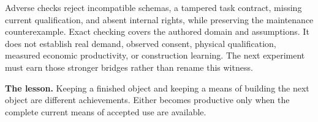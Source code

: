 Adverse checks reject incompatible schemas, a tampered task contract, missing
current qualification, and absent internal rights, while preserving the
maintenance counterexample. Exact checking covers the authored domain and
assumptions. It does not establish real demand, observed consent, physical
qualification, measured economic productivity, or construction learning. The
next experiment must earn those stronger bridges rather than rename this witness.

\begin{thesisbox}
\textbf{The lesson.} Keeping a finished object and keeping a means of building
the next object are different achievements. Either becomes productive only when
the complete current means of accepted use are available.
\end{thesisbox}
